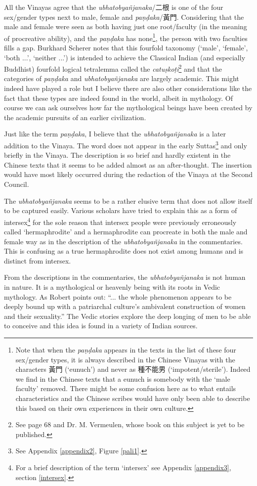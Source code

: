All the Vinayas agree that the {\em ubhatob­yañ­janaka}/二根 is one of the four sex/gender types next to male, female and {\em paṇḍaka}/黃門. Considering that the male and female were seen as both having just one root/faculty (in the meaning of procreative ability), and the {\em paṇḍaka} has none\footnote{Note that when the {\em paṇḍaka} appears in the texts in the list of these four sex/gender types, it is always described in the Chinese Vinayas with the characters 黃門 (`eunuch') and never as 種不能男 (`impotent/sterile'). Indeed we find in the Chinese texts that a eunuch is somebody with the `male faculty' removed. There might be some confusion here as to what entails characteristics and the Chinese scribes would have only been able to describe this based on their own experiences in their own culture.}, the person with two faculties fills a gap. Burkhard Scherer notes that this fourfold taxonomy (`male', `female', `both ...', `neither ...') is intended to achieve the Classical Indian (and especially Buddhist) fourfold logical tetralemma called the {\em catuṣkoṭi}\footnote{See \cite{scherer} page 68 and Dr. M. Vermeulen, whose book on this subject is yet to be published.} and that the categories of {\em paṇḍaka} and {\em ubhatob­yañ­janaka} are largely academic. This might indeed have played a role but I believe there are also other considerations like the fact that these types are indeed found in the world, albeit in mythology. Of course we can ask ourselves how far the mythological beings have been created by the academic pursuits of an earlier civilization. 

Just like the term {\em paṇḍaka}, I believe that the {\em ubhatob­yañ­janaka} is a later addition to the Vinaya. The word does not appear in the early Suttas\footnote{See Appendix \ref{appendix2}, Figure \ref{pali1}.} and only briefly in the Vinaya. The description is so brief and hardly existent in the Chinese texts that it seems to be added almost as an after-thought. The insertion would have most likely occurred during the redaction of the Vinaya at the Second Council.

The {\em ubhatob­yañ­janaka} seems to be a rather elusive term that does not allow itself to be captured easily. Various scholars have tried to explain this as a form of intersex\footnote{For a brief description of the term `intersex' see Appendix \ref{appendix3}, section \ref{intersex}.} for the sole reason that intersex people were previously erroneously called `hermaphrodite' and a hermaphrodite can procreate in both the male and female way as in the description of the {\em ubhatob­yañ­janaka} in the commentaries. This is confusing as a true hermaphrodite does not exist among humans and is distinct from intersex. 

From the descriptions in the commentaries, the {\em ubhatob­yañ­janaka} is not human in nature. It is a mythological or heavenly being with its roots in  Vedic mythology. As Robert \cite{goldman} points out: ``... the whole phenomenon appears to be deeply bound up with a patriarchal culture's ambivalent construction of women and their sexuality.'' The Vedic stories explore the deep longing of men to be able to conceive and this idea is found in a variety of Indian sources.

